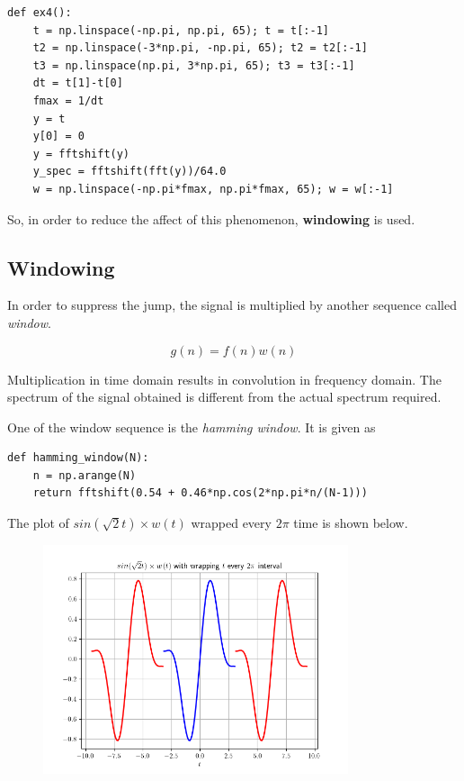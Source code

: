 \documentclass[12pt, a4paper]{article}
\begin{document}
\begin{lstlisting}
def ex4():
    t = np.linspace(-np.pi, np.pi, 65); t = t[:-1]
    t2 = np.linspace(-3*np.pi, -np.pi, 65); t2 = t2[:-1]
    t3 = np.linspace(np.pi, 3*np.pi, 65); t3 = t3[:-1]
    dt = t[1]-t[0]
    fmax = 1/dt
    y = t
    y[0] = 0
    y = fftshift(y)
    y_spec = fftshift(fft(y))/64.0
    w = np.linspace(-np.pi*fmax, np.pi*fmax, 65); w = w[:-1]
\end{lstlisting}

So, in order to reduce the affect of this phenomenon, \textbf{windowing} is used.

\subsection{Windowing}

In order to suppress the jump, the signal is multiplied by another sequence called \textit{window}.

\begin{equation*}
g(n) = f(n)w(n)
\end{equation*}

Multiplication in time domain results in convolution in frequency domain. The spectrum of the signal obtained is different from the actual spectrum required.

One of the window sequence is the \textit{hamming window}. It is given as

\begin{lstlisting}
def hamming_window(N):
    n = np.arange(N)
    return fftshift(0.54 + 0.46*np.cos(2*np.pi*n/(N-1)))
\end{lstlisting}

The plot of $sin(\sqrt{2}t) \times w(t)$ wrapped every $2\pi$ time is shown below.

\begin{figure}[H]
\centering
\includegraphics[width=0.8\textwidth]{ex5.png}
\end{figure}
\end{document}
